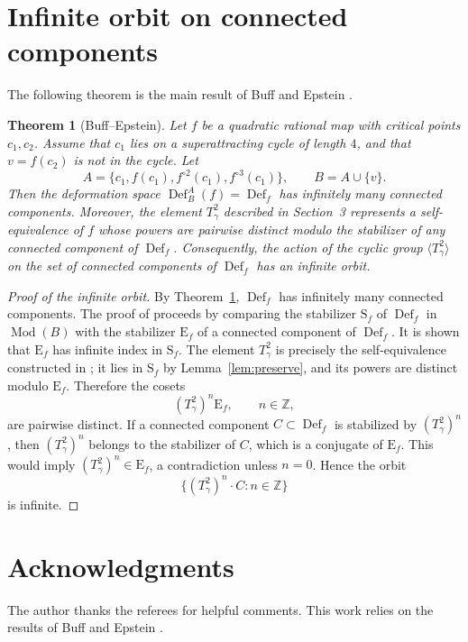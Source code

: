 \documentclass[12pt]{article}
\newtheorem{theorem}{Theorem}[section]
\theoremstyle{definition}
\newcommand{\Mod}{\operatorname{Mod}}
\newcommand{\Def}{\operatorname{Def}}
\begin{document}
\section{Infinite orbit on connected components}

The following theorem is the main result of Buff and Epstein \cite{BE}.

\begin{theorem}[Buff--Epstein]\label{thm:main}
Let \(f\) be a quadratic rational map with critical points \(c_1,c_2\). Assume that \(c_1\) lies on a superattracting cycle of length \(4\), and that \(v=f(c_2)\) is not in the cycle. Let
\[
A=\{c_1,f(c_1),f^{\circ 2}(c_1),f^{\circ 3}(c_1)\},\qquad B=A\cup\{v\}.
\]
Then the deformation space \(\Def_B^A(f)=\Def_f\) has infinitely many connected components.
Moreover, the element \(T_\gamma^2\) described in Section~3 represents a self-equivalence of \(f\) whose powers are pairwise distinct modulo the stabilizer of any connected component of \(\Def_f\). Consequently, the action of the cyclic group \(\langle T_\gamma^2\rangle\) on the set of connected components of \(\Def_f\) has an infinite orbit.
\end{theorem}

\begin{proof}[Proof of the infinite orbit]
By Theorem~\ref{thm:main}, \(\Def_f\) has infinitely many connected components. The proof of \cite[Theorem~1.3]{BE} proceeds by comparing the stabilizer \(\mathrm{S}_f\) of \(\Def_f\) in \(\Mod(B)\) with the stabilizer \(\mathrm{E}_f\) of a connected component of \(\Def_f\). It is shown that \(\mathrm{E}_f\) has infinite index in \(\mathrm{S}_f\). The element \(T_\gamma^2\) is precisely the self-equivalence constructed in \cite[Section~4]{BE}; it lies in \(\mathrm{S}_f\) by Lemma~\ref{lem:preserve}, and its powers are distinct modulo \(\mathrm{E}_f\). Therefore the cosets
\[
(T_\gamma^2)^n \mathrm{E}_f,\qquad n\in\mathbb Z,
\]
are pairwise distinct. If a connected component \(C\subset\Def_f\) is stabilized by \((T_\gamma^2)^n\), then \((T_\gamma^2)^n\) belongs to the stabilizer of \(C\), which is a conjugate of \(\mathrm{E}_f\). This would imply \((T_\gamma^2)^n\in\mathrm{E}_f\), a contradiction unless \(n=0\). Hence the orbit
\[
\{ (T_\gamma^2)^n\cdot C : n\in\mathbb Z\}
\]
is infinite.
\end{proof}

\section*{Acknowledgments}
The author thanks the referees for helpful comments. This work relies on the results of Buff and Epstein \cite{BE}.
\end{document}
